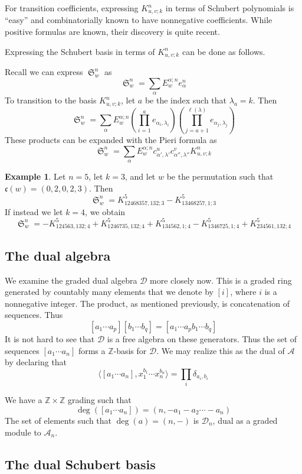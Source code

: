 \documentclass{amsart}
\theoremstyle{definition}
\newtheorem{example}[lemma]{Example}
\theoremstyle{remark}
\numberwithin{equation}{subsection}
\DeclareMathOperator{\sch}{\mathfrak{S}}
\newcommand{\coma}{\mathcal{A}}
\newcommand{\dcoma}{\mathcal{D}}
\newcommand{\code}{\mathfrak{c}}
\begin{document}
For transition coefficients, expressing $K_{u,v;k}^n$ in terms of Schubert polynomials is ``easy'' and combinatorially known to have nonnegative coefficients. While positive formulas are known, their discovery is quite recent.

Expressing the Schubert basis in terms of $K_{u,v;k}^n$ can be done as follows.

Recall we can express $\sch_w^n$ as
$$\sch_w^n = \sum_{\alpha} E_w^{\alpha;n}e_{\alpha}^n$$
To transition to the basis $K_{u,v;k}^n$, let $a$ be the index such that $\lambda_a = k$. Then
$$\sch_w^n = \sum_{\alpha} E_w^{\alpha;n}\left(\prod_{i=1}^a e_{\alpha_i,\lambda_i}\right)\left(\prod_{j=a+1}^{\ell(\lambda)} e_{\alpha_j,\lambda_j}\right)$$
These products can be expanded with the Pieri formula as
$$\sch_w^n = \sum_{\alpha}E_w^{\alpha;n}c_{\alpha',\lambda'}^uc_{\alpha'',\lambda''}^vK_{u,v;k}^n$$

\begin{example}
	Let $n=5$, let $k=3$, and let $w$ be the permutation such that $\code(w)=(0,2,0,2,3)$. Then
	$$\sch_w^n =K_{12468357, 132;3}^5 - K_{13468257, 1; 3}^5$$
	If instead we let $k=4$, we obtain
	$$\sch_w^n =-K_{124563, 132;4}^5+ K_{1246735, 132;4}^5+ K_{134562, 1;4}^5- K_{1346725, 1;4}^5+ K_{234561, 132;4}^5$$
\end{example}


\subsection{The dual algebra}

We examine the graded dual algebra $\dcoma$ more closely now. This is a graded ring generated by countably many elements that we denote by $[i]$, where $i$ is a nonnegative integer. The product, as mentioned previously, is concatenation of sequences. Thus
$$[a_1\cdots a_p][b_1\cdots b_q]=[a_1\cdots a_pb_1\cdots b_q]$$
It is not hard to see that $\dcoma$ is a free algebra on these generators. Thus the set of sequences $[a_1\cdots a_n]$ forms a $\mathbb{Z}$-basis for $\dcoma$. We may realize this as the dual of $\coma$ by declaring that
$$\langle [a_1\cdots a_n],x_1^{b_1}\cdots x_n^{b_n}\rangle = \prod_i\delta_{a_i,b_i}$$

We have a $\mathbb{Z}\times \mathbb{Z}$ grading such that
$$\deg([a_1\cdots a_n])=(n,-a_1-a_2\cdots-a_n)$$
The set of elements such that $\deg(a) = (n,-)$ is $\dcoma_n$, dual as a graded module to $\coma_n$.

\subsection{The dual Schubert basis}
       
\end{document}

